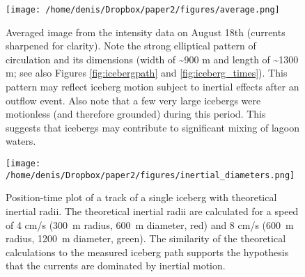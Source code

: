 \begin{figure}
\centering
\texttt{[image: /home/denis/Dropbox/paper2/figures/average.png]}
\caption[Averaged image from the intensity data on August 18th (currents sharpened for clarity).]{Averaged image from the intensity data on August 18th (currents sharpened for clarity). Note the strong elliptical pattern of circulation and its dimensions (width of \textasciitilde900 m and length of \textasciitilde1300 m; see also Figures \ref{fig:icebergpath} and \ref{fig:iceberg_times}). This pattern may reflect iceberg motion subject to inertial effects after an outflow event. Also note that a few very large icebergs were motionless (and therefore grounded) during this period. This suggests that icebergs may contribute to significant mixing of lagoon waters.}
\label{fig:intertialmotion}
\end{figure}

\begin{figure}
\centering
\texttt{[image: /home/denis/Dropbox/paper2/figures/inertial\_diameters.png]}
\caption[Position-time plot of a track of a single iceberg with theoretical inertial radii.]{Position-time plot of a track of a single iceberg with theoretical inertial radii. The theoretical inertial radii are calculated for a speed of 4 cm/s (300~m radius, 600~m diameter, red) and 8 cm/s (600~m radius, 1200~m diameter, green). The similarity of the theoretical calculations to the measured iceberg path supports the hypothesis that the currents are dominated by inertial motion.}
\label{fig:circles}
\end{figure}









% 